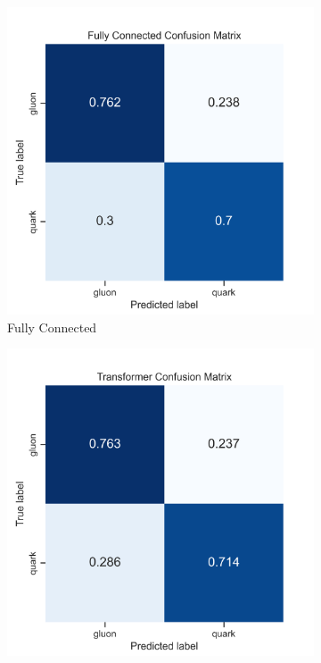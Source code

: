 \begin{figure}[!htb]
	\centering
	\begin{subfigure}[t]{0.38\textwidth}
		\includegraphics[width=1\textwidth]{src/plots/results/cm/fc.png}
		\caption{Fully Connected}
		\label{fig:app_cm_fc}
	\end{subfigure}
	\begin{subfigure}[t]{0.38\textwidth}
		\includegraphics[width=1\textwidth]{src/plots/results/cm/transformer.png}

\end{subfigure}
\end{figure}
